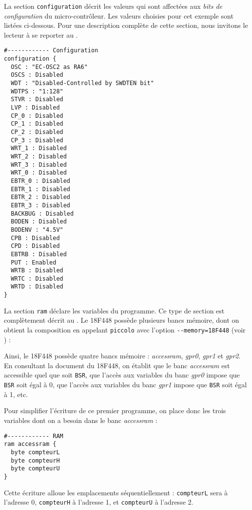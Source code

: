 La section \texttt{configuration} décrit les valeurs qui sont affectées aux \emph{bits de configuration} du micro-contrôleur. Les valeurs choisies pour cet exemple sont listées ci-dessous. Pour une description complète de cette section, nous invitons le lecteur à se reporter au .
\begin{lstlisting}[language=piccolo]
#------------ Configuration
configuration {
  OSC : "EC-OSC2 as RA6"
  OSCS : Disabled
  WDT : "Disabled-Controlled by SWDTEN bit"
  WDTPS : "1:128"
  STVR : Disabled
  LVP : Disabled
  CP_0 : Disabled
  CP_1 : Disabled
  CP_2 : Disabled
  CP_3 : Disabled
  WRT_1 : Disabled
  WRT_2 : Disabled
  WRT_3 : Disabled
  WRT_0 : Disabled
  EBTR_0 : Disabled
  EBTR_1 : Disabled
  EBTR_2 : Disabled
  EBTR_3 : Disabled
  BACKBUG : Disabled
  BODEN : Disabled
  BODENV : "4.5V"
  CPB : Disabled
  CPD : Disabled
  EBTRB : Disabled
  PUT : Enabled
  WRTB : Disabled
  WRTC : Disabled
  WRTD : Disabled
}
\end{lstlisting}


La section \texttt{ram} déclare les variables du programme. Ce type de section est complètement décrit au . Le 18F448 possède plusieurs bancs mémoire, dont on obtient la composition en appelant \texttt{piccolo} avec l'option \texttt{-{}-memory=18F448} (voir ) :


{\footnotesize }

Ainsi, le 18F448 possède quatre bancs mémoire : \emph{accessram}, \emph{gpr0}, \emph{gpr1} et \emph{gpr2}. En consultant la document du 18F448, on établit que le banc \emph{accessram} est accessible quel que soit \texttt{BSR}, que l'accès aux variables du banc \emph{gpr0} impose que \texttt{BSR} soit égal à 0, que l'accès aux variables du banc \emph{gpr1} impose que \texttt{BSR} soit égal à 1, etc.

Pour simplifier l'écriture de ce premier programme, on place donc les trois variables dont on a besoin dans le banc \emph{accessram} :
\begin{lstlisting}[language=piccolo]
#------------ RAM
ram accessram {
  byte compteurL
  byte compteurH
  byte compteurU
}
\end{lstlisting}

Cette écriture alloue les emplacements séquentiellement : \texttt{compteurL} sera à l'adresse 0, \texttt{compteurH} à l'adresse 1, et \texttt{compteurU} à l'adresse 2.

